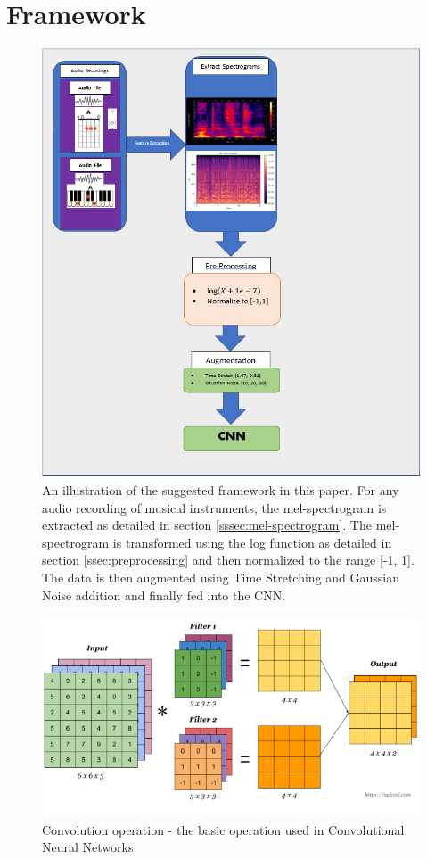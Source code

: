 \documentclass[a4paper]{article}
\begin{document}
\section{Framework} \label{sec:framework}
\begin{figure}[t]
\centering
\includegraphics[width=\textwidth]{figure1.png}
\caption{An illustration of the suggested framework in this paper. For any audio recording of musical instruments, the mel-spectrogram is extracted as detailed in section \ref{sssec:mel-spectrogram}. The mel-spectrogram is transformed using the log function as detailed in section \ref{ssec:preprocessing} and then normalized to the range [-1, 1]. The data is then augmented using Time Stretching and Gaussian Noise addition and finally fed into the CNN.}
\label{fig:img1}
\end{figure}

\begin{figure}[!h]
\includegraphics[width=.5\textwidth]{convolution.png}
\caption{Convolution operation - the basic operation used in Convolutional Neural Networks.}
\label{fig:conv}
\end{figure}
\end{document}
